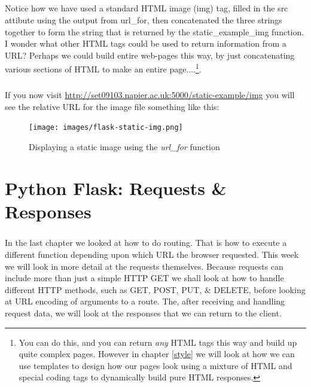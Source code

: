 \documentclass[12pt, a4paper, oneside]{book}
\begin{document}
\paragraph{} Notice how we have used a standard HTML image (img) tag, filled in the src attibute using the output from url\_for, then concatenated the three strings together to form the string that is returned by the static\_example\_img function. I wonder what other HTML tags could be used to return information from a URL? Perhaps we could build entire web-pages this way, by just concatenating various sections of HTML to make an entire page....\footnote{You can do this, and you can return \emph{any} HTML tags this way and build up quite complex pages. However in chapter \ref{style} we will look at how we can use templates to design how our pages look using a mixture of HTML and special coding tags to dynamically build pure HTML responses.}.

\paragraph{} If you now visit \url{http://set09103.napier.ac.uk:5000/static-example/img} you will see the relative URL for the image file something like this:

\begin{figure}[H]
\centering
\texttt{[image: images/flask-static-img.png]}
\caption{Displaying a static image using the \emph{url\_for} function}
\label{fig:flask-static-img}
\end{figure}



\chapter{Python Flask: Requests \& Responses}
\label{lab04}
\paragraph{} In the last chapter we looked at how to do routing. That is how to execute a different function depending upon which URL the browser requested. This week we will look in more detail at the requests themselves. Because requests can include more than just a simple HTTP GET we shall look at how to handle different HTTP methods, such as GET, POST, PUT, \& DELETE, before looking at URL encoding of arguments to a route. The, after receiving and handling request data, we will look at the responses that we can return to the client.
\end{document}
